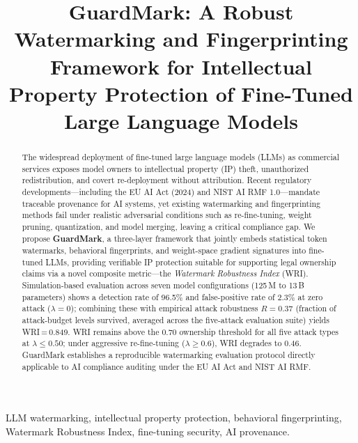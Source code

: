 \documentclass[conference]{IEEEtran}
\begin{document}
\title{GuardMark: A Robust Watermarking and Fingerprinting Framework for
       Intellectual Property Protection of Fine-Tuned Large Language Models}

\author{
}

\maketitle

\begin{abstract}
The widespread deployment of fine-tuned large language models (LLMs) as
commercial services exposes model owners to intellectual property (IP) theft,
unauthorized redistribution, and covert re-deployment without attribution.
Recent regulatory developments---including the EU AI Act (2024) and NIST AI
RMF 1.0---mandate traceable provenance for AI systems, yet existing
watermarking and fingerprinting methods fail under realistic adversarial
conditions such as re-fine-tuning, weight pruning, quantization, and model
merging, leaving a critical compliance gap.
We propose \textbf{GuardMark}, a three-layer framework that jointly embeds
statistical token watermarks, behavioral fingerprints, and weight-space
gradient signatures into fine-tuned LLMs, providing verifiable IP protection
suitable for supporting legal ownership claims via a novel composite metric---the
\emph{Watermark Robustness Index} (WRI).
Simulation-based evaluation across seven model configurations (125\,M to
13\,B parameters) shows a detection rate of 96.5\% and false-positive rate of
2.3\% at zero attack ($\lambda{=}0$); combining these with empirical attack
robustness $R{=}0.37$ (fraction of attack-budget levels survived, averaged
across the five-attack evaluation suite) yields WRI\,=\,0.849.
WRI remains above the 0.70 ownership threshold for all five attack types at
$\lambda \leq 0.50$; under aggressive re-fine-tuning ($\lambda \geq 0.6$),
WRI degrades to 0.46.
GuardMark establishes a reproducible watermarking evaluation protocol directly
applicable to AI compliance auditing under the EU AI Act and NIST AI RMF.
\end{abstract}

\begin{IEEEkeywords}
LLM watermarking, intellectual property protection, behavioral fingerprinting,
Watermark Robustness Index, fine-tuning security, AI provenance.
\end{IEEEkeywords}
\end{document}

